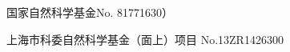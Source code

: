 
\begin{projects}{99}
    \item 国家自然科学基金\quad No. 81771630）
    \item 上海市科委自然科学基金（面上）项目\quad{} No.13ZR1426300
\end{projects}
